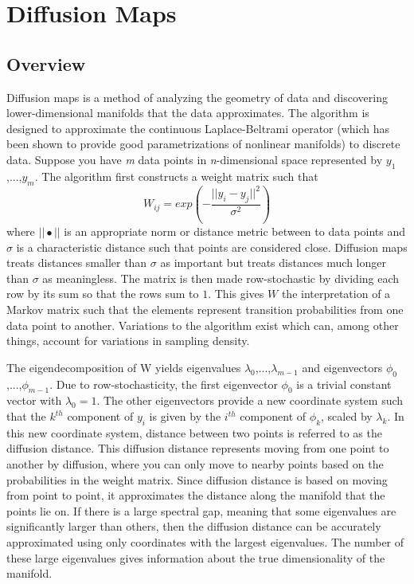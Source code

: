 \documentclass[12pt]{article}
\begin{document}
\section{Diffusion Maps}

\subsection{Overview}

Diffusion maps is a method of analyzing the geometry of data and discovering lower-dimensional manifolds that the data approximates. The algorithm is designed to approximate the continuous Laplace-Beltrami operator (which has been shown to provide good parametrizations of nonlinear manifolds) to discrete data. Suppose you have \textit{m} data points in \textit{n}-dimensional space represented by $y_1$,...,$y_\textit{m}$. The algorithm first constructs a weight matrix such that\\
\[
W_{ij}=exp(-\frac{||y_i-y_j||^2}{\sigma ^2})
\]
where $|| \bullet ||$ is an appropriate norm or distance metric between to data points and $\sigma$ is a characteristic distance such that points are considered close. Diffusion maps treats distances smaller than $\sigma$ as important but treats distances much longer than $\sigma$ as meaningless. The matrix is then made row-stochastic by dividing each row by its sum so that the rows sum to $1$. This gives $W$ the interpretation of a Markov matrix such that the elements represent transition probabilities from one data point to another. Variations to the algorithm exist which can, among other things, account for variations in sampling density.\vspace{1mm}

The eigendecomposition of W yields eigenvalues $\lambda _0$,...,$\lambda_{m-1}$ and eigenvectors $\phi _0$,...,$\phi_{m-1}$. Due to row-stochasticity, the first eigenvector $\phi_0$ is a trivial constant vector with $\lambda_0 = 1$. The other eigenvectors provide a new coordinate system such that the $k^{th}$ component of $y_i$ is given by the $i^{th}$ component of $\phi_k$, scaled by $\lambda_k$. In this new coordinate system, distance between two points is referred to as the diffusion distance. This diffusion distance represents moving from one point to another by diffusion, where you can only move to nearby points based on the probabilities in the weight matrix. Since diffusion distance is based on moving from point to point, it approximates the distance along the manifold that the points lie on. If there is a large spectral gap, meaning that some eigenvalues are significantly larger than others, then the diffusion distance can be accurately approximated using only coordinates with the largest eigenvalues.  The number of these large eigenvalues gives information about the true dimensionality of the manifold.
\end{document}
